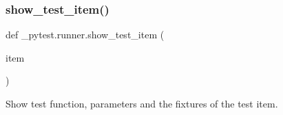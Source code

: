 \subsubsection{\texorpdfstring{show\+\_\+test\+\_\+item()}{show\_test\_item()}}
{\footnotesize\ttfamily def \+\_\+pytest.\+runner.\+show\+\_\+test\+\_\+item (\begin{DoxyParamCaption}\item[{}]{item }\end{DoxyParamCaption})}

\begin{DoxyVerb}Show test function, parameters and the fixtures of the test item.\end{DoxyVerb}
 